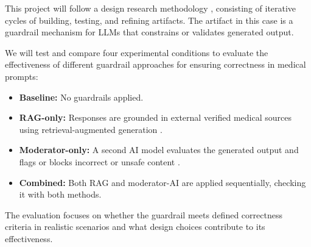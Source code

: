 %

This project will follow a design research methodology \citep{wieringa2014design}, consisting of iterative cycles of building, testing, and refining artifacts.
The artifact in this case is a guardrail mechanism for LLMs that constrains or validates generated output.

We will test and compare four experimental conditions to evaluate the effectiveness of different guardrail approaches for ensuring correctness in medical prompts:

\begin{itemize}
    \item \textbf{Baseline:} No guardrails applied.
    \item \textbf{RAG-only:} Responses are grounded in external verified medical sources using retrieval-augmented generation \citep{dong2024guardrails}.
    \item \textbf{Moderator-only:} A second AI model evaluates the generated output and flags or blocks incorrect or unsafe content \citep{inan2023llamaguard}.
    \item \textbf{Combined:} Both RAG and moderator-AI are applied sequentially, checking it with both methods.
\end{itemize}

The evaluation focuses on whether the guardrail meets defined correctness criteria in realistic scenarios and what design choices contribute to its effectiveness.

